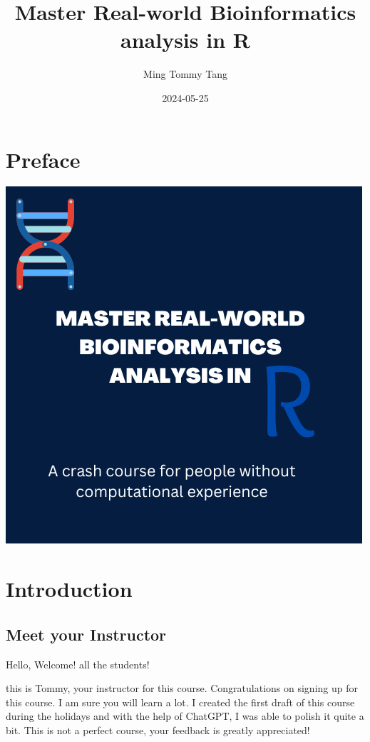 \documentclass[
]{book}
\title{Master Real-world Bioinformatics analysis in R}
\author{Ming Tommy Tang}
\date{2024-05-25}
\begin{document}
\maketitle

{
\setcounter{tocdepth}{1}
\tableofcontents
}
\hypertarget{preface}{%
\chapter{Preface}\label{preface}}

\includegraphics{images/bookcover.png}

\hypertarget{intro}{%
\chapter{Introduction}\label{intro}}

\hypertarget{meet-your-instructor}{%
\section{Meet your Instructor}\label{meet-your-instructor}}

Hello, Welcome! all the students!

this is Tommy, your instructor for this course. Congratulations on signing up for this course. I am sure you will learn a lot. I created the first draft of this course during the holidays and with the help of ChatGPT, I was able to polish it quite a bit. This is not a perfect course, your feedback is greatly appreciated!
\end{document}
